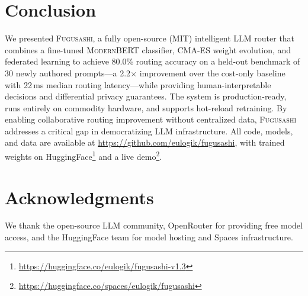 \documentclass[11pt,a4paper]{article}
\newcommand{\fugusashi}{\textsc{Fugusashi}}
\newcommand{\modernbert}{\textsc{ModernBERT}}
\begin{document}
\section{Conclusion}

We presented \fugusashi{}, a fully open-source (MIT) intelligent LLM router that combines a fine-tuned \modernbert{} classifier, CMA-ES weight evolution, and federated learning to achieve 80.0\% routing accuracy on a held-out benchmark of 30 newly authored prompts---a 2.2$\times$ improvement over the cost-only baseline with 22\,ms median routing latency---while providing human-interpretable decisions and differential privacy guarantees.
The system is production-ready, runs entirely on commodity hardware, and supports hot-reload retraining.
By enabling collaborative routing improvement without centralized data, \fugusashi{} addresses a critical gap in democratizing LLM infrastructure.
All code, models, and data are available at \url{https://github.com/eulogik/fugusashi}, with trained weights on HuggingFace\footnote{\url{https://huggingface.co/eulogik/fugusashi-v1.3}} and a live demo\footnote{\url{https://huggingface.co/spaces/eulogik/fugusashi}}.

\section*{Acknowledgments}
We thank the open-source LLM community, OpenRouter for providing free model access, and the HuggingFace team for model hosting and Spaces infrastructure.
\end{document}
